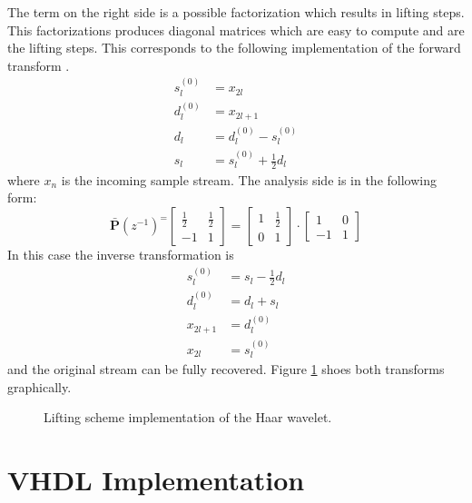 \begin{refsection}
The term on the right side is a possible factorization which results in lifting steps.
This factorizations produces diagonal matrices which are easy to compute and are the lifting steps.
This corresponds to the following implementation of the forward transform \cite{fpga:Daubechies1998}.
\begin{equation}\label{fpga:equation:haar}
	\begin{aligned}
	s_l^{(0)} &= x_{2l} \\
	d_l^{(0)} &= x_{2l+1} \\ 
	d_l &= d_l^{(0)} - s_l^{(0)} \\
	s_l &= s_l^{(0)} + \frac{1}{2}d_l
	\end{aligned}
\end{equation}
where $x_{n}$ is the incoming sample stream.
The analysis side is in the following form:
\begin{equation*}
\bm {\bar P}(z^{-1})^ =
\begin{bmatrix}
\frac{1}{2} & \frac{1}{2} \\
-1 & 1
\end{bmatrix}
= 
\begin{bmatrix}
1 & \frac{1}{2} \\
0 & 1
\end{bmatrix}
\cdot
\begin{bmatrix}
1 & 0 \\
-1 & 1
\end{bmatrix}
\end{equation*}
In this case the inverse transformation is 
\begin{equation}\label{fpga:equation:inv_haar}
\begin{aligned}
s_l^{(0)} &= s_l - \frac{1}{2}d_l \\
d_l^{(0)} &= d_l + s_l \\ 
x_{2l+1}& =d_l^{(0)} \\
x_{2l} &= s_l^{(0)}
\end{aligned}
\end{equation}
and the original stream can be fully recovered.
Figure \ref{fpga:fig:liftingStepHaar} shoes both transforms graphically.
\begin{figure}
	\centering
	
	\caption{Lifting scheme implementation of the Haar wavelet.}
	\label{fpga:fig:liftingStepHaar}
\end{figure}

\section{VHDL Implementation}


\end{refsection}
